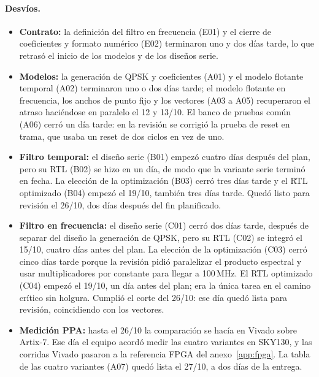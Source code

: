 \paragraph{Desvíos.}
\begin{itemize}
  \item \textbf{Contrato:} la definición del filtro en frecuencia (E01) y el cierre de coeficientes y formato numérico (E02) terminaron uno y dos días tarde, lo que retrasó el inicio de los modelos y de los diseños serie.
  \item \textbf{Modelos:} la generación de QPSK y coeficientes (A01) y el modelo flotante temporal (A02) terminaron uno o dos días tarde; el modelo flotante en frecuencia, los anchos de punto fijo y los vectores (A03 a A05) recuperaron el atraso haciéndose en paralelo el 12 y 13/10. El banco de pruebas común (A06) cerró un día tarde: en la revisión se corrigió la prueba de reset en trama, que usaba un reset de dos ciclos en vez de uno.
  \item \textbf{Filtro temporal:} el diseño serie (B01) empezó cuatro días después del plan, pero su RTL (B02) se hizo en un día, de modo que la variante serie terminó en fecha. La elección de la optimización (B03) cerró tres días tarde y el RTL optimizado (B04) empezó el 19/10, también tres días tarde. Quedó listo para revisión el 26/10, dos días después del fin planificado.
  \item \textbf{Filtro en frecuencia:} el diseño serie (C01) cerró dos días tarde, después de separar del diseño la generación de QPSK, pero su RTL (C02) se integró el 15/10, cuatro días antes del plan. La elección de la optimización (C03) cerró cinco días tarde porque la revisión pidió paralelizar el producto espectral y usar multiplicadores por constante para llegar a 100\,MHz. El RTL optimizado (C04) empezó el 19/10, un día antes del plan; era la única tarea en el camino crítico sin holgura. Cumplió el corte del 26/10: ese día quedó lista para revisión, coincidiendo con los vectores.
  \item \textbf{Medición PPA:} hasta el 26/10 la comparación se hacía en Vivado sobre Artix-7. Ese día el equipo acordó medir las cuatro variantes en SKY130, y las corridas Vivado pasaron a la referencia FPGA del anexo~\ref{app:fpga}. La tabla de las cuatro variantes (A07) quedó lista el 27/10, a dos días de la entrega.
\end{itemize}
